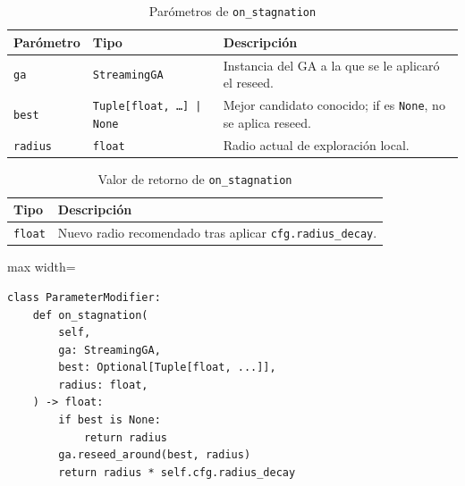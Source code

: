 \begin{table}[H]
  \centering
  \caption{Parómetros de \texttt{on\_stagnation}}
  \small
  \begin{tabularx}{\textwidth}{@{}p{}p{}X@{}}
    \toprule
    \textbf{Parómetro} & \textbf{Tipo} & \textbf{Descripción} \\
    \midrule
    \texttt{ga} & \texttt{StreamingGA} & Instancia del GA a la que se le aplicaró el reseed. \\
    \texttt{best} & \texttt{Tuple[float, \dots] | None} & Mejor candidato conocido; if es \texttt{None}, no se aplica reseed. \\
    \texttt{radius} & \texttt{float} & Radio actual de exploración local. \\
    \bottomrule
  \end{tabularx}
\end{table}

\begin{table}[H]
  \centering
  \caption{Valor de retorno de \texttt{on\_stagnation}}
  \small
  \begin{tabularx}{\textwidth}{@{}p{}X@{}}
    \toprule
    \textbf{Tipo} & \textbf{Descripción} \\
    \midrule
    \texttt{float} & Nuevo radio recomendado tras aplicar \texttt{cfg.radius\_decay}. \\
    \bottomrule
  \end{tabularx}
\end{table}

\begin{listing}[H]
\caption{Bloque de código de \texttt{on\_stagnation}}
\begin{adjustbox}{max width=\textwidth}
\begin{minipage}{\textwidth}
\begin{verbatim}
class ParameterModifier:
    def on_stagnation(
        self,
        ga: StreamingGA,
        best: Optional[Tuple[float, ...]],
        radius: float,
    ) -> float:
        if best is None:
            return radius
        ga.reseed_around(best, radius)
        return radius * self.cfg.radius_decay
\end{verbatim}
\end{minipage}
\end{adjustbox}
\end{listing}

